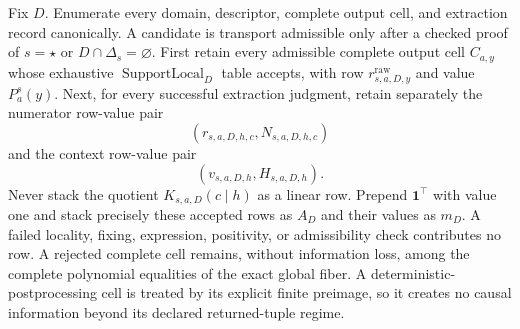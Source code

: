 Fix \(D\).  Enumerate every domain, descriptor, complete output cell, and extraction record canonically.  A candidate is transport admissible only after a checked proof of \(s=\star\) or \(D\cap\Delta_s=\varnothing\).  First retain every admissible complete output cell \(C_{a,y}\) whose exhaustive \(\operatorname{SupportLocal}_D\) table accepts, with row \(r^{\mathrm{raw}}_{s,a,D,y}\) and value \(P_a^s(y)\).  Next, for every successful extraction judgment, retain separately the numerator row-value pair
\[
(r_{s,a,D,h,c},N_{s,a,D,h,c})
\]
and the context row-value pair
\[
(v_{s,a,D,h},H_{s,a,D,h}).
\]
Never stack the quotient \(K_{s,a,D}(c\mid h)\) as a linear row.  Prepend \(\mathbf 1^\top\) with value one and stack precisely these accepted rows as \(A_D\) and their values as \(m_D\).  A failed locality, fixing, expression, positivity, or admissibility check contributes no row.  A rejected complete cell remains, without information loss, among the complete polynomial equalities of the exact global fiber.  A deterministic-postprocessing cell is treated by its explicit finite preimage, so it creates no causal information beyond its declared returned-tuple regime.